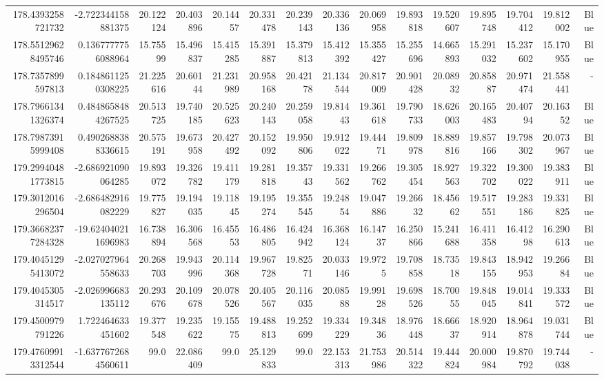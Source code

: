 \begin{center}
\begin{longtable}{rrrrrrrrrrrrrrr}
178.4393258721732 & -2.722344158881375 & 20.122124 & 20.403896 & 20.14457 & 20.331478 & 20.239143 & 20.336136 & 20.069958 & 19.893818 & 19.520607 & 19.895748 & 19.704412 & 19.812002 & Blue \\
178.55129628495746 & 0.1367777756088964 & 15.75599 & 15.496837 & 15.415285 & 15.391887 & 15.379813 & 15.412392 & 15.355427 & 15.255696 & 14.665893 & 15.291032 & 15.237602 & 15.170955 & Blue \\
178.7357899597813 & 0.1848611250308225 & 21.225616 & 20.60144 & 21.231989 & 20.958168 & 20.42178 & 21.134544 & 20.817009 & 20.901428 & 20.08932 & 20.85887 & 20.971474 & 21.558441 & - \\
178.79661341326374 & 0.4848658484267525 & 20.513725 & 19.740185 & 20.525623 & 20.240143 & 20.259058 & 19.81443 & 19.361618 & 19.790733 & 18.626003 & 20.165483 & 20.40794 & 20.16352 & Blue \\
178.79873915999408 & 0.4902688388336615 & 20.575191 & 19.673958 & 20.427492 & 20.152092 & 19.950806 & 19.912022 & 19.44471 & 19.809978 & 18.889816 & 19.857166 & 19.798302 & 20.073967 & Blue \\
179.29940481773815 & -2.686921090064285 & 19.893072 & 19.326782 & 19.411179 & 19.281818 & 19.35743 & 19.331562 & 19.266762 & 19.305454 & 18.927563 & 19.322702 & 19.300022 & 19.383911 & Blue \\
179.3012016296504 & -2.686482916082229 & 19.775827 & 19.194035 & 19.11845 & 19.195274 & 19.355545 & 19.24854 & 19.047886 & 19.26632 & 18.45662 & 19.517551 & 19.283186 & 19.331825 & Blue \\
179.36682377284328 & -19.624040211696983 & 16.738894 & 16.306568 & 16.45553 & 16.486805 & 16.424942 & 16.368124 & 16.14737 & 16.250866 & 15.241688 & 16.411358 & 16.41298 & 16.290613 & Blue \\
179.40451295413072 & -2.027027964558633 & 20.268703 & 19.943996 & 20.114368 & 19.967728 & 19.82571 & 20.033146 & 19.9725 & 19.708858 & 18.73518 & 19.843155 & 18.942953 & 19.26684 & Blue \\
179.4045305314517 & -2.026996683135112 & 20.293676 & 20.109678 & 20.078526 & 20.405567 & 20.116035 & 20.08588 & 19.99128 & 19.698526 & 18.70055 & 19.848045 & 19.014841 & 19.333572 & Blue \\
179.4500979791226 & 1.722464633451602 & 19.377548 & 19.235622 & 19.15575 & 19.488813 & 19.252699 & 19.334229 & 19.34836 & 18.976448 & 18.66637 & 18.920914 & 18.964878 & 19.031744 & Blue \\
179.47609913312544 & -1.6377672684560611 & 99.0 & 22.086409 & 99.0 & 25.129833 & 99.0 & 22.153313 & 21.753986 & 20.514322 & 19.444824 & 20.000984 & 19.870792 & 19.744038 & - \\

\end{longtable}
\end{center}
